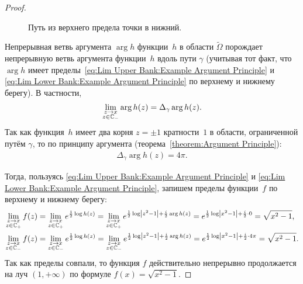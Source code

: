 \documentclass[../complex-analysis.tex]{subfiles}
\begin{document}
\begin{proof}
 \begin{figure}[ht]
  \centering
  \caption{Путь из верхнего предела точки в нижний.}
  \label{fig:example_analytic_square_path}
 \end{figure}

 Непрерывная ветвь аргумента $ \arg h $ функции~$ h $ в области $ \tilde\Omega $ порождает непрерывную ветвь аргумента функции~$ h $ вдоль пути $ \gamma $ (учитывая тот факт, что $ \arg h $ имеет пределы~\eqref{eq:Lim Upper Bank:Example Argument Principle} и \eqref{eq:Lim Lower Bank:Example Argument Principle} по верхнему и нижнему берегу). В частности,
 \begin{align*}
  \lim_{\substack{z \to x \\ z \in \mathbb{C}_-}}  \arg h(z) = \Delta_\gamma \arg h(z).
 \end{align*} Так как функция~$ h $ имеет два корня $ z=\pm 1 $ кратности~$ 1 $ в области, ограниченной путём $ \gamma $, то по принципу аргумента (теорема~\ref{theorem:Argument Principle}):
 \begin{align*}
  \Delta_\gamma \arg h(z) = 4\pi.
 \end{align*}

 Тогда, пользуясь \eqref{eq:Lim Upper Bank:Example Argument Principle} и \eqref{eq:Lim Lower Bank:Example Argument Principle}, запишем пределы функции~$ f $ по верхнему и нижнему берегу:
 \begin{align*}
  \lim_{\substack{z \to x \\ z \in \mathbb{C}_+}}  f(z) &= \lim_{\substack{z \to x \\ z \in \mathbb{C}_+}} e^{\frac{1}{2} \log h(z)} = \lim_{\substack{z \to x \\ z \in \mathbb{C}_+}} e^{\frac{1}{2} \log \left| z^{2}-1 \right| + \frac{i}{2} \arg h(z)} = e^{\frac{1}{2} \log \left| x^{2}-1 \right| + \frac{i}{2} \cdot 0} = \sqrt{x^{2}-1},\\
  \lim_{\substack{z \to x \\ z \in \mathbb{C}_-}} f(z) &= \lim_{\substack{z \to x \\ z \in \mathbb{C}_-}} e^{\frac{1}{2}\log h(z)} = \lim_{\substack{z \to x \\ z \in \mathbb{C}_-}} e^{\frac{1}{2} \log \left| z^{2}-1 \right| + \frac{i}{2} \arg h(z)} = e^{\frac{1}{2} \log\left| x^{2}-1\right| + \frac{i}{2} \cdot 4\pi} = \sqrt{x^{2}-1}.
 \end{align*} Так как пределы совпали, то функция $ f $ действительно непрерывно продолжается на луч $ (1,+\infty) $ по формуле $ f(x) = \sqrt{x^{2}-1} $.


\end{proof}
\end{document}
